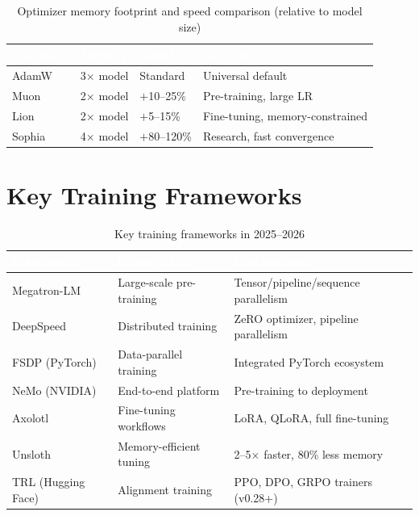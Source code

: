 \begin{table}[H]
\centering\small\sffamily
{}
\begin{tabular}{L{2.5cm}L{2.5cm}L{2.5cm}L{3cm}}
\toprule
{}\textcolor{white}{\textbf{Optimizer}} & \textcolor{white}{\textbf{Memory}} & \textcolor{white}{\textbf{Speed}} & \textcolor{white}{\textbf{Best For}} \\
\midrule
AdamW & 3$\times$ model & Standard & Universal default \\
Muon & 2$\times$ model & $+$10--25\% & Pre-training, large LR \\
Lion & 2$\times$ model & $+$5--15\% & Fine-tuning, memory-constrained \\
Sophia & 4$\times$ model & $+$80--120\% & Research, fast convergence \\
\bottomrule
\end{tabular}
\caption{Optimizer memory footprint and speed comparison (relative to model size)}
\end{table}


\section{Key Training Frameworks}

\begin{table}[H]
\centering\small\sffamily
{}
\begin{tabular}{L{3cm}L{3.5cm}L{4cm}}
\toprule
{}\textcolor{white}{\textbf{Framework}} & \textcolor{white}{\textbf{Primary Use}} & \textcolor{white}{\textbf{Key Features}} \\
\midrule
Megatron-LM & Large-scale pre-training & Tensor/pipeline/sequence parallelism \\
DeepSpeed & Distributed training & ZeRO optimizer, pipeline parallelism \\
FSDP (PyTorch) & Data-parallel training & Integrated PyTorch ecosystem \\
NeMo (NVIDIA) & End-to-end platform & Pre-training to deployment \\
Axolotl & Fine-tuning workflows & LoRA, QLoRA, full fine-tuning \\
Unsloth & Memory-efficient tuning & 2--5$\times$ faster, 80\% less memory \\
TRL (Hugging Face) & Alignment training & PPO, DPO, GRPO trainers (v0.28+) \\
\bottomrule
\end{tabular}
\caption{Key training frameworks in 2025--2026}
\end{table}


